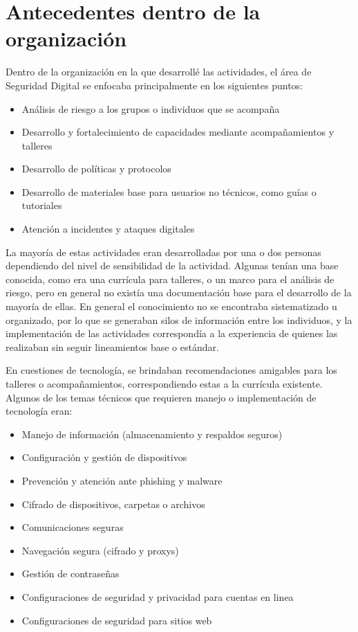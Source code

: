 \documentclass[12pt]{caltech_thesis}
\begin{document}
\section{Antecedentes dentro de la organización}

Dentro de la organización en la que desarrollé las actividades, el área de Seguridad Digital se enfocaba principalmente en los siguientes puntos:

\begin{itemize}
    \item Análisis de riesgo a los grupos o individuos que se acompaña
    \item Desarrollo y fortalecimiento de capacidades mediante acompañamientos y talleres
    \item Desarrollo de políticas y protocolos
    \item Desarrollo de materiales base para usuarios no técnicos, como guías o tutoriales
    \item Atención a incidentes y ataques digitales
\end{itemize}

La mayoría de estas actividades eran desarrolladas por una o dos personas dependiendo del nivel de sensibilidad de la actividad. Algunas tenían una base conocida, como era una currícula para talleres, o un marco para el análisis de riesgo, pero en general no existía una documentación base para el desarrollo de la mayoría de ellas. En general el conocimiento no se encontraba sistematizado u organizado, por lo que se generaban silos de información entre los individuos, y la implementación de las actividades correspondía a la experiencia de quienes las realizaban sin seguir lineamientos base o estándar.

En cuestiones de tecnología, se brindaban recomendaciones amigables para los talleres o acompañamientos, correspondiendo estas a la currícula existente. Algunos de los temas técnicos que requieren manejo o implementación de tecnología eran:

\begin{itemize}
    \item Manejo de información (almacenamiento y respaldos seguros)
    \item Configuración y gestión de dispositivos
    \item Prevención y atención ante phishing y malware
    \item Cifrado de dispositivos, carpetas o archivos
    \item Comunicaciones seguras
    \item Navegación segura (cifrado y proxys)
    \item Gestión de contraseñas
    \item Configuraciones de seguridad y privacidad para cuentas en linea
    \item Configuraciones de seguridad para sitios web
\end{itemize}
\end{document}
